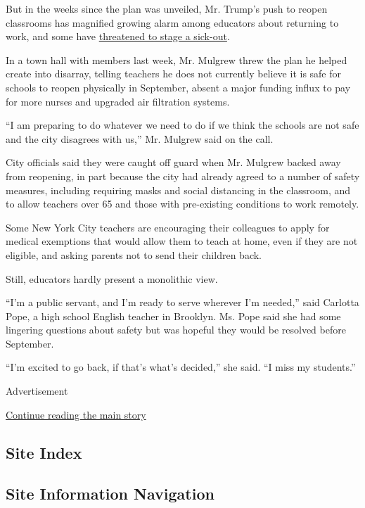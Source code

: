 But in the weeks since the plan was unveiled, Mr. Trump's push to reopen
classrooms has magnified growing alarm among educators about returning
to work, and some have
\href{https://twitter.com/Liat_RO/status/1281288365472649216}{threatened
to stage a sick-out}.

In a town hall with members last week, Mr. Mulgrew threw the plan he
helped create into disarray, telling teachers he does not currently
believe it is safe for schools to reopen physically in September, absent
a major funding influx to pay for more nurses and upgraded air
filtration systems.

``I am preparing to do whatever we need to do if we think the schools
are not safe and the city disagrees with us,'' Mr. Mulgrew said on the
call.

City officials said they were caught off guard when Mr. Mulgrew backed
away from reopening, in part because the city had already agreed to a
number of safety measures, including requiring masks and social
distancing in the classroom, and to allow teachers over 65 and those
with pre-existing conditions to work remotely.

Some New York City teachers are encouraging their colleagues to apply
for medical exemptions that would allow them to teach at home, even if
they are not eligible, and asking parents not to send their children
back.

Still, educators hardly present a monolithic view.

``I'm a public servant, and I'm ready to serve wherever I'm needed,''
said Carlotta Pope, a high school English teacher in Brooklyn. Ms. Pope
said she had some lingering questions about safety but was hopeful they
would be resolved before September.

``I'm excited to go back, if that's what's decided,'' she said. ``I miss
my students.''

Advertisement

\protect\hyperlink{after-bottom}{Continue reading the main story}

\hypertarget{site-index}{%
\subsection{Site Index}\label{site-index}}

\hypertarget{site-information-navigation}{%
\subsection{Site Information
Navigation}\label{site-information-navigation}}


